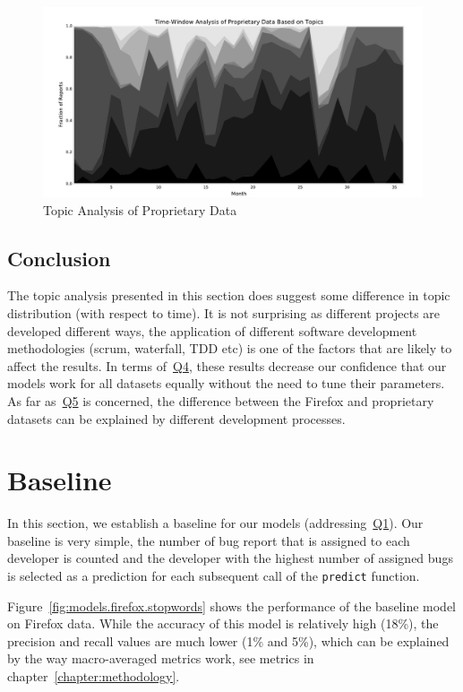 \begin{figure}[htbp]
    \centering
        \includegraphics[width=\textwidth]{./images/topic_component_distribution/proprietary_topic_10.pdf}
    \caption{Topic Analysis of Proprietary Data}
    \label{fig:distribution.prop.topic}
\end{figure}

\subsection{Conclusion}

The topic analysis presented in this section does suggest some difference in topic distribution (with respect to time). It is not surprising as different projects are developed different ways, the application of different software development methodologies (scrum, waterfall, TDD etc) is one of the factors that are likely to affect the results. In terms of~\hyperlink{question:4}{Q4}, these results decrease our confidence that our models work for all datasets equally without the need to tune their parameters. As far as~\hyperlink{question:5}{Q5} is concerned, the difference between the Firefox and proprietary datasets can be explained by different development processes.

\section{Baseline}
\label{section:baseline}

In this section, we establish a baseline for our models (addressing~\hyperlink{question:1}{Q1}). Our baseline is very simple, the number of bug report that is assigned to each developer is counted and the developer with the highest number of assigned bugs is selected as a prediction for each subsequent call of the \texttt{predict} function.

Figure~\ref{fig:models.firefox.stopwords} shows the performance of the baseline model on Firefox data. While the accuracy of this model is relatively high (18\%), the precision and recall values are much lower (1\% and 5\%), which can be explained by the way macro-averaged metrics work, see metrics in chapter~\ref{chapter:methodology}. 

